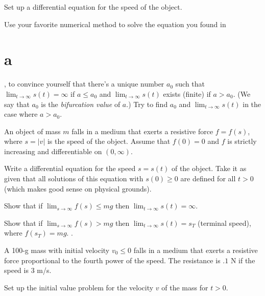 \begin{exerciselist}
  \begin{alist}
    \item %
    Set up a differential equation for the speed of the object.

    \item %
    Use your favorite numerical method to solve the equation you found in \part{a}, to convince
    yourself that there's a unique number $a_{0}$ such that $\lim_{t\to\infty}s(t)=\infty$ if
    $a\le a_{0}$ and $\lim_{t\to\infty}s(t)$ exists (finite) if $a>a_{0}$. (We say that $a_{0}$ is
    the {\color{blue}\it bifurcation value\/} of $a$.) Try to find $a_{0}$ and
    $\lim_{t\to\infty}s(t)$ in the case where $a>a_{0}$. 
  \end{alist}

  \item\label{exer:4.3.14} An object of mass $m$ falls in a medium that exerts a resistive force
        $f=f(s)$, where $s=|v|$ is the speed of the object. Assume that $f(0)=0$ and $f$ is strictly
        increasing and differentiable on $(0,\infty)$.
  \begin{alist}
    \item %
    Write a differential equation for the speed $s=s(t)$ of the object. Take it as given that all
    solutions of this equation with $s(0)\ge0$ are defined for all $t>0$ (which makes good sense on
    physical grounds).

    \item %
    Show that if $\lim_{s\to\infty}f(s)\le mg$ then $\lim_{t\to\infty}s(t)=\infty$.

    \item %
    Show that if $\lim_{s\to\infty}f(s)>mg$ then $\lim_{t\to\infty}s(t)=s_{T}$ (terminal speed),
    where $f(s_{T})=mg$. .
  \end{alist}

  \item\label{exer:4.3.15} A 100-g mass with initial velocity $v_{0}\le0$ falls in a medium that
        exerts a resistive force proportional to the fourth power of the speed. The resistance is
        $.1$ N if the speed is 3 m/s.

  \begin{alist}
    \item %
    Set up the initial value problem for the velocity $v$ of the mass for $t>0$.


\end{alist}
\end{exerciselist}
